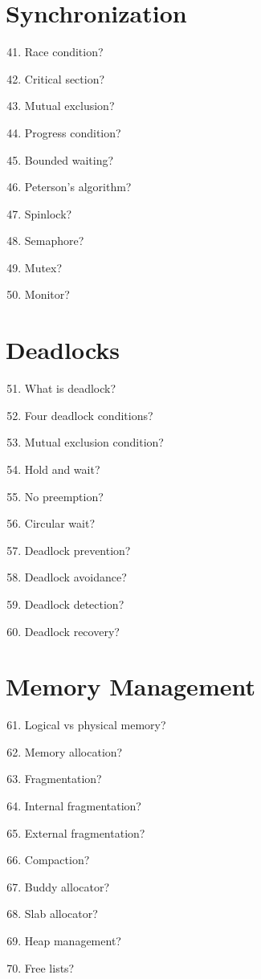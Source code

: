 \section{Synchronization}

\begin{enumerate}
\setcounter{enumi}{40}
\item Race condition?
\item Critical section?
\item Mutual exclusion?
\item Progress condition?
\item Bounded waiting?
\item Peterson's algorithm?
\item Spinlock?
\item Semaphore?
\item Mutex?
\item Monitor?
\end{enumerate}

\section{Deadlocks}

\begin{enumerate}
\setcounter{enumi}{50}
\item What is deadlock?
\item Four deadlock conditions?
\item Mutual exclusion condition?
\item Hold and wait?
\item No preemption?
\item Circular wait?
\item Deadlock prevention?
\item Deadlock avoidance?
\item Deadlock detection?
\item Deadlock recovery?
\end{enumerate}

\section{Memory Management}

\begin{enumerate}
\setcounter{enumi}{60}
\item Logical vs physical memory?
\item Memory allocation?
\item Fragmentation?
\item Internal fragmentation?
\item External fragmentation?
\item Compaction?
\item Buddy allocator?
\item Slab allocator?
\item Heap management?
\item Free lists?
\end{enumerate}

